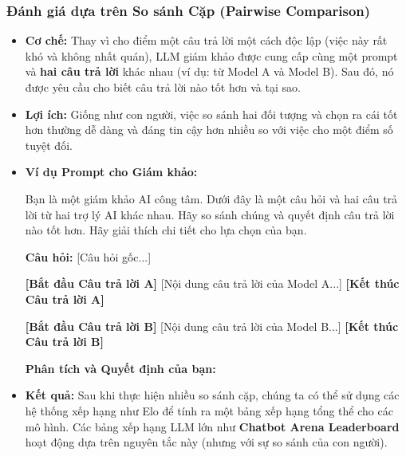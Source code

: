 \subsubsection{Đánh giá dựa trên So sánh Cặp (Pairwise Comparison)}
\begin{itemize}
    \item \textbf{Cơ chế:} Thay vì cho điểm một câu trả lời một cách độc lập (việc này rất khó và không nhất quán), LLM giám khảo được cung cấp cùng một prompt và \textbf{hai câu trả lời} khác nhau (ví dụ: từ Model A và Model B). Sau đó, nó được yêu cầu cho biết câu trả lời nào tốt hơn và tại sao.
    \item \textbf{Lợi ích:} Giống như con người, việc so sánh hai đối tượng và chọn ra cái tốt hơn thường dễ dàng và đáng tin cậy hơn nhiều so với việc cho một điểm số tuyệt đối.
    \item \textbf{Ví dụ Prompt cho Giám khảo:}
        \begin{tcolorbox}[colback=gray!5!white, colframe=gray!50!black, sharp corners]
        Bạn là một giám khảo AI công tâm. Dưới đây là một câu hỏi và hai câu trả lời từ hai trợ lý AI khác nhau. Hãy so sánh chúng và quyết định câu trả lời nào tốt hơn. Hãy giải thích chi tiết cho lựa chọn của bạn.

        \textbf{Câu hỏi:} [Câu hỏi gốc...]
        
        \textbf{[Bắt đầu Câu trả lời A]}
        [Nội dung câu trả lời của Model A...]
        \textbf{[Kết thúc Câu trả lời A]}

        \textbf{[Bắt đầu Câu trả lời B]}
        [Nội dung câu trả lời của Model B...]
        \textbf{[Kết thúc Câu trả lời B]}
        
        \textbf{Phân tích và Quyết định của bạn:}
        \end{tcolorbox}
    \item \textbf{Kết quả:} Sau khi thực hiện nhiều so sánh cặp, chúng ta có thể sử dụng các hệ thống xếp hạng như Elo để tính ra một bảng xếp hạng tổng thể cho các mô hình. Các bảng xếp hạng LLM lớn như \textbf{Chatbot Arena Leaderboard} hoạt động dựa trên nguyên tắc này (nhưng với sự so sánh của con người).
\end{itemize}

